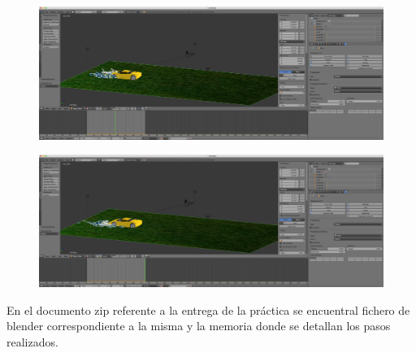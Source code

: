 \documentclass[10pt]{article}
\begin{document}
\begin{figure}[H]
	\begin{center}
	 		\includegraphics[width = 1.00\textwidth]{Imagenes/p5-img22}
	\end{center} 
\end{figure}

\begin{figure}[H]
	\begin{center}
	 		\includegraphics[width = 1.00\textwidth]{Imagenes/p5-img23}
	\end{center} 
\end{figure}

En el documento zip referente a la entrega de la práctica se encuentral fichero de blender correspondiente a la misma y la memoria donde se detallan los pasos realizados.
\end{document}
